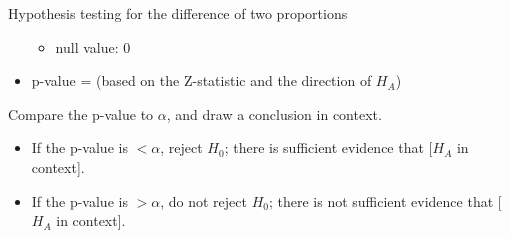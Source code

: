 \begin{onebox}{Hypothesis testing for the difference of two proportions}
\begin{itemize}
\begin{itemize}
\item[] null value: 0
\end{itemize}
\item[] p-value = (based on the Z-statistic and the direction of $H_A$)
\end{itemize}
  Compare the p-value to $\alpha$, and draw a conclusion in context.\vspace{-1mm}
\begin{itemize}
\item[] If the p-value is $< \alpha$, reject $H_0$; there is sufficient evidence that [$H_A$ in context]. 
\item[] If the p-value is $> \alpha$, do not reject $H_0$; there is not sufficient evidence that [$H_A$ in context].
\end{itemize}\end{onebox}


